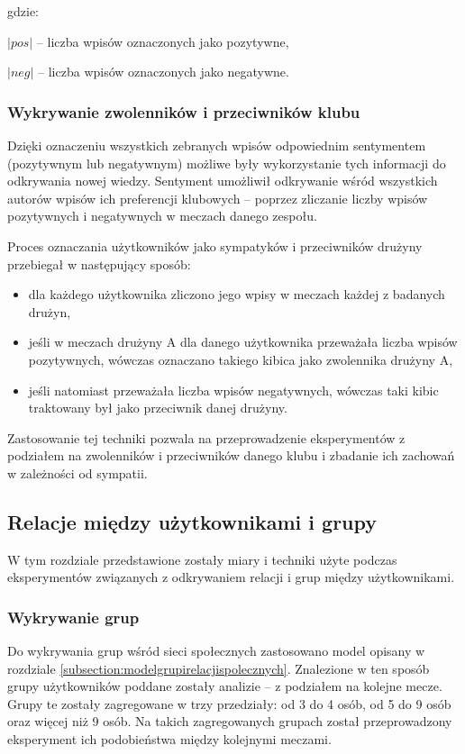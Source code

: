 gdzie:

$|pos|$ -- liczba wpisów oznaczonych jako pozytywne,

$|neg|$ -- liczba wpisów oznaczonych jako negatywne.



\subsubsection{Wykrywanie zwolenników i przeciwników klubu}
\label{subsubsection:wykrywaniezwolennikow}

Dzięki oznaczeniu wszystkich zebranych wpisów odpowiednim sentymentem
(pozytywnym lub negatywnym) możliwe były wykorzystanie tych informacji do
odkrywania nowej wiedzy. Sentyment umożliwił odkrywanie wśród wszystkich
autorów wpisów ich preferencji klubowych -- poprzez zliczanie liczby wpisów
pozytywnych i negatywnych w meczach danego zespołu.

Proces oznaczania użytkowników jako sympatyków i przeciwników drużyny przebiegał
w następujący sposób:
\begin{itemize}
  \item dla każdego użytkownika zliczono jego wpisy w meczach każdej z badanych 
  drużyn,
  \item jeśli w meczach drużyny A dla danego użytkownika przeważała liczba 
  wpisów pozytywnych, wówczas oznaczano takiego kibica jako zwolennika drużyny A,
  \item jeśli natomiast przeważała liczba wpisów negatywnych, wówczas taki kibic
  traktowany był jako przeciwnik danej drużyny.  
\end{itemize} 

Zastosowanie tej techniki pozwala na przeprowadzenie eksperymentów z podziałem
na zwolenników i przeciwników danego klubu i zbadanie ich zachowań w zależności
od sympatii.




\subsection{Relacje między użytkownikami i grupy}
\label{subsection:miary-relacje}
W tym rozdziale przedstawione zostały miary i techniki użyte podczas
eksperymentów związanych z odkrywaniem relacji i grup między użytkownikami.

\subsubsection{Wykrywanie grup}
\label{subsubsection:koncepcja-wykrywaniegrup}
Do wykrywania grup wśród sieci społecznych zastosowano model opisany w
rozdziale \ref{subsection:modelgrupirelacjispolecznych}. Znalezione w ten sposób grupy
użytkowników poddane zostały analizie -- z podziałem na kolejne mecze.
Grupy te zostały zagregowane w trzy przedziały: od 3 do 4 osób, od 5 do 9 osób
oraz więcej niż 9 osób. Na takich zagregowanych grupach został przeprowadzony
eksperyment ich podobieństwa między kolejnymi meczami.

